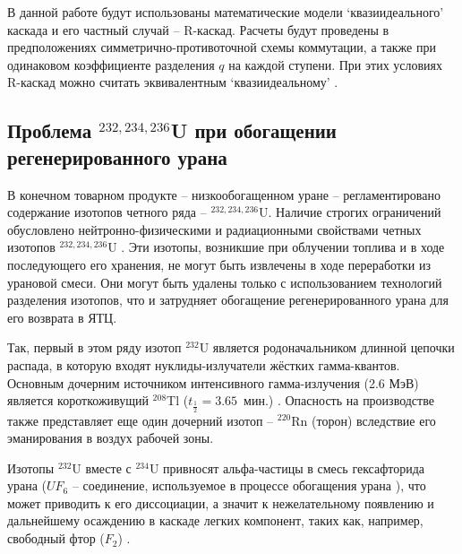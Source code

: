 В данной работе будут использованы математические модели  `квазиидеального' каскада и его частный случай -- R-каскад. Расчеты будут проведены в предположениях симметрично-противоточной схемы коммутации, а также при одинаковом коэффициенте разделения $q$ на каждой ступени. При этих условиях R-каскад можно считать эквивалентным `квазиидеальному' \cite{zengRelationshipNonmixingCascade2020}.

\subsection{Проблема $^{232,234,236}$U при обогащении регенерированного урана}

В конечном товарном продукте -- низкообогащенном уране -- регламентировано содержание изотопов четного ряда -- $^{232,234,236}$U.
Наличие строгих ограничений обусловлено нейтронно-физическими и радиационными свойствами четных изотопов $^{232,234,236}$U \cite{smirnovEvolutionIsotopicComposition2012, proselkovAnalizVozmozhnostiIspolzovaniya2003, dudnikovInfluence236UEfficacy2016}.
Эти изотопы, возникшие при облучении топлива и в ходе последующего его хранения, не могут быть извлечены в ходе переработки из урановой смеси. Они могут быть удалены только с использованием технологий разделения изотопов, что и затрудняет обогащение регенерированного урана для его возврата в ЯТЦ.

Так, первый в этом ряду изотоп $^{232}$U является родоначальником длинной цепочки распада, в которую входят нуклиды-излучатели жёстких гамма-квантов.
Основным дочерним источником интенсивного гамма-излучения (2.6 МэВ) является короткоживущий $^{208}$Tl ($t_{\frac{1}{2}}=3.65$ мин.) \cite{matveevUran232EgoVliyanie1985,abbasProliferationResistanceFeatures2013}. Опасность на производстве также представляет еще один дочерний изотоп -- $^{220}$Rn (торон) вследствие его эманирования в воздух рабочей зоны.

Изотопы $^{232}$U вместе с $^{234}$U привносят альфа-частицы в смесь гексафторида урана ($UF_6$ -- соединение, используемое в процессе обогащения урана \cite{orlovWayObtainUranium2015, orlovDesublimationPurificationTransporting2017}), что может приводить к его диссоциации, а значит к нежелательному появлению и дальнейшему осаждению в каскаде легких компонент, таких как, например, свободный фтор ($F_2$) \cite{kryuchkovObogashchennyyUranDobavleniem2007, bernhardtRadiationEffectsAlpha1958, shmelevRazrabotkaRaschetnoyModeli2012}.

